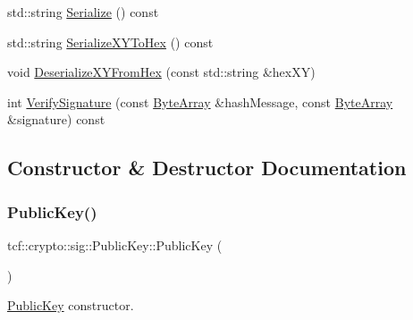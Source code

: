 \begin{DoxyCompactItemize}
\item 
std\+::string \hyperlink{classtcf_1_1crypto_1_1sig_1_1PublicKey_a94acd8c4f5ad579f80c6b11a4d11f07c}{Serialize} () const
\item 
std\+::string \hyperlink{classtcf_1_1crypto_1_1sig_1_1PublicKey_a84fdc18e9b8975bd49a567b062b05125}{Serialize\+X\+Y\+To\+Hex} () const
\item 
void \hyperlink{classtcf_1_1crypto_1_1sig_1_1PublicKey_a91ca55783c9c20686d8b8f3e3ed029a3}{Deserialize\+X\+Y\+From\+Hex} (const std\+::string \&hex\+XY)
\item 
int \hyperlink{classtcf_1_1crypto_1_1sig_1_1PublicKey_a298e2971d1d237d45719fc9de64d57f0}{Verify\+Signature} (const \hyperlink{types_8h_a35da937e2331acce98d47f44892f4a76}{Byte\+Array} \&hash\+Message, const \hyperlink{types_8h_a35da937e2331acce98d47f44892f4a76}{Byte\+Array} \&signature) const
\end{DoxyCompactItemize}


\subsection{Constructor \& Destructor Documentation}
\mbox{\label{classtcf_1_1crypto_1_1sig_1_1PublicKey_aa337e4675d5831cd3a553d168b268430}} 
\subsubsection{\texorpdfstring{Public\+Key()}{PublicKey()}\hspace{0.1cm}{\footnotesize\ttfamily [1/2]}}
{\footnotesize\ttfamily tcf\+::crypto\+::sig\+::\+Public\+Key\+::\+Public\+Key (\begin{DoxyParamCaption}{ }\end{DoxyParamCaption})}

\hyperlink{classtcf_1_1crypto_1_1sig_1_1PublicKey}{Public\+Key} constructor. \mbox{\label{classtcf_1_1crypto_1_1sig_1_1PublicKey_aacb62a84346f7f055d1aed9f1a4209f5}} 
